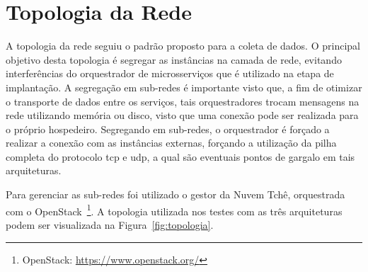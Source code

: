 \section{Topologia da Rede}
\label{sec:topologia}

A topologia da rede seguiu o padrão proposto para a coleta de dados.
%
O principal objetivo desta topologia é segregar as instâncias na camada de rede, evitando interferências do orquestrador de microsserviços que é utilizado na etapa de implantação.
%
A segregação em sub-redes é importante visto que, a fim de otimizar o transporte de dados entre os serviços, tais orquestradores trocam mensagens na rede utilizando memória ou disco, visto que uma conexão pode ser realizada para o próprio hospedeiro.
%
Segregando em sub-redes, o orquestrador é forçado a realizar a conexão com as instâncias externas, forçando a utilização da pilha completa do protocolo \ac{tcp} e \ac{udp}, a qual são eventuais pontos de gargalo em tais arquiteturas.

Para gerenciar as sub-redes foi utilizado o gestor da Nuvem Tchê, orquestrada com o OpenStack~\footnote{OpenStack: \url{https://www.openstack.org/}}.
%
A topologia utilizada nos testes com as três arquiteturas podem ser visualizada na Figura~\ref{fig:topologia}.


